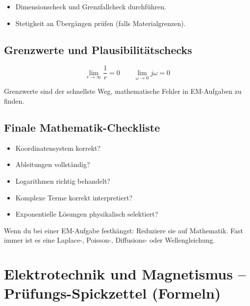 \documentclass[a4paper]{article}
\begin{document}
\begin{checkitem}
\begin{itemize}
  \item Dimensionscheck und Grenzfallcheck durchführen.
  \item Stetigkeit an Übergängen prüfen (falls Materialgrenzen).
\end{itemize}
\end{checkitem}

\subsection{Grenzwerte und Plausibilitätschecks}

\[
\lim_{r\to\infty}\frac{1}{r}=0
\qquad
\lim_{\omega\to 0} j\omega = 0
\]

\begin{merke}
Grenzwerte sind der schnellste Weg,
mathematische Fehler in EM-Aufgaben zu finden.
\end{merke}


\subsection{Finale Mathematik-Checkliste}

\begin{checkitem}
\begin{itemize}
  \item Koordinatensystem korrekt?
  \item Ableitungen vollständig?
  \item Logarithmen richtig behandelt?
  \item Komplexe Terme korrekt interpretiert?
  \item Exponentielle Lösungen physikalisch selektiert?
\end{itemize}
\end{checkitem}

\begin{taktik}
Wenn du bei einer EM-Aufgabe festhängst:
Reduziere sie auf Mathematik.
Fast immer ist es eine Laplace-, Poisson-, Diffusions- oder Wellengleichung.
\end{taktik}
\section{Elektrotechnik und Magnetismus – Prüfungs-Spickzettel (Formeln)}
\end{document}
